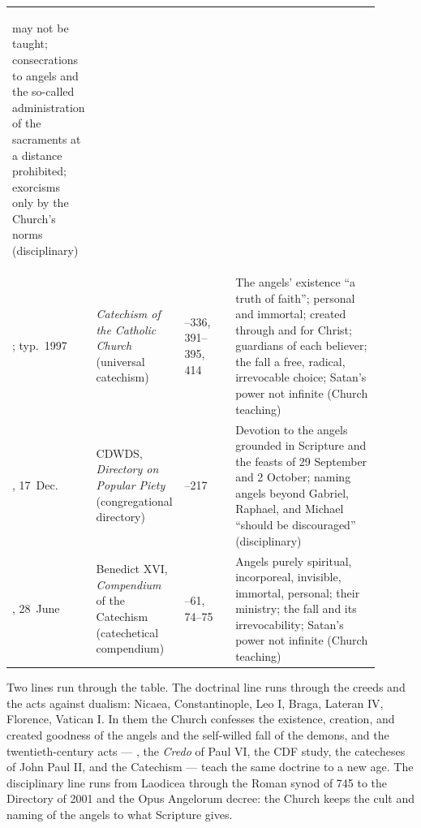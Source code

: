 \begin{longtable}{>{\bfseries\raggedright\arraybackslash}p{0.12\linewidth}>{\raggedright\arraybackslash}p{0.24\linewidth}>{\raggedright\arraybackslash}p{0.14\linewidth}>{\raggedright\arraybackslash}p{0.40\linewidth}}
may not be taught; consecrations to angels and the so-called administration
of the sacraments at a distance prohibited; exorcisms only by the Church's norms (disciplinary)\\
1992; typ.\ 1997 & \emph{Catechism of the Catholic Church} (universal
catechism) & 328--336, 391--395, 414 & The angels' existence ``a truth of
faith''; personal and immortal; created through and for Christ; guardians
of each believer; the fall a free, radical, irrevocable choice; Satan's
power not infinite (Church teaching)\\
2001, 17~Dec. & CDWDS, \emph{Directory on Popular Piety} (congregational
directory) & 213--217 & Devotion to the angels grounded in Scripture and
the feasts of 29 September and 2 October; naming angels beyond Gabriel,
Raphael, and Michael ``should be discouraged'' (disciplinary)\\
2005, 28~June & Benedict XVI, \emph{Compendium} of the Catechism
(catechetical compendium) & 59--61, 74--75 & Angels purely spiritual,
incorporeal, invisible, immortal, personal; their ministry; the fall and
its irrevocability; Satan's power not infinite (Church teaching)\\
\bottomrule
\end{longtable}
\endgroup

Two lines run through the table. The doctrinal line runs through the
creeds and the acts against dualism: Nicaea, Constantinople, Leo I, Braga,
Lateran IV, Florence, Vatican I. In them the Church confesses the
existence, creation, and created goodness of the angels and the
self-willed fall of the demons, and the twentieth-century acts ---
, the \emph{Credo} of Paul VI, the CDF study, the
catecheses of John Paul II, and the Catechism --- teach the same doctrine
to a new age. The disciplinary line runs from Laodicea through the Roman
synod of 745 to the Directory of 2001 and the Opus Angelorum decree: the
Church keeps the cult and naming of the angels to what Scripture gives.

